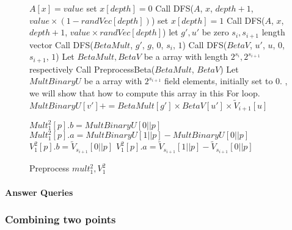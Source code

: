 \begin{figure}[p]
\begin{algorithm}[H]
\label{alg::parttwo}
\caption{Preprocess $mult_1^2, V_1^2$}
\begin{algorithmic}[1]
		\State $A[x]=value$
	\Else
		\State set $x[depth]=0$
		\State Call DFS($A$, $x$, $depth + 1$, $value \times (1-randVec[depth])$)
		\State set $x[depth]=1$
		\State Call DFS($A$, $x$, $depth + 1$, $value \times randVec[depth]$)
	\EndIf
\EndProcedure
{}
	\State let $g', u'$ be zero $s_{i}, s_{i+1}$ length vector
	\State Call {\sf DFS}($BetaMult$, $g'$, $g$, $0$, $s_{i}$, $1$)
	\State Call {\sf DFS}($BetaV$, $u'$, $u$, $0$, $s_{i + 1}$, $1$)
\EndProcedure
{}
	\State Let $BetaMult, BetaV$ be a array with length $2^{s_{i}}, 2^{s_{i+1}}$ respectively
	\State Call {\sf PreprocessBeta}($BetaMult$, $BetaV$)
	\State Let $MultBinaryU$ be a array with $2^{s_{i+1}}$ field elements, initially set to $0$.
	, we will show that how to compute this array in this For loop.
			\State $MultBinaryU[v'] += BetaMult[g'] \times BetaV[u'] \times \tilde{V}_{i+1}[u]$
		\EndFor
	\EndFor

		\State $Mult_1^2[p].b = MultBinaryU[0||p]$
		\State $Mult_1^2[p].a = MultBinaryU[1||p]-MultBinaryU[0||p]$
		\State $V_1^2[p].b = \tilde{V}_{s_{i+1}}[0||p]$
		\State $V_1^2[p].a = \tilde{V}_{s_{i+1}}[1||p]-\tilde{V}_{s_{i+1}}[0||p]$
	\EndFor
\EndProcedure
\end{algorithmic}
\end{algorithm}
\end{figure}

\paragraph*{Answer Queries}


\subsubsection{Combining two points}